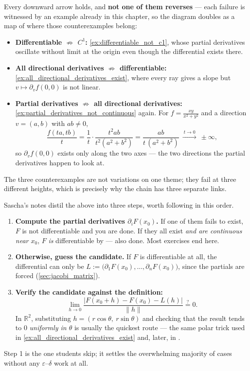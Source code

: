 Every downward arrow holds, and \textbf{not one of them reverses} --- each failure is witnessed
by an example already in this chapter, so the diagram doubles as a map of where those
counterexamples belong:
\begin{itemize}
  \item \textbf{Differentiable $\not\Rightarrow$ $C^1$:} \cref{ex:differentiable_not_c1}, whose
    partial derivatives oscillate without limit at the origin even though the differential
    exists there.
  \item \textbf{All directional derivatives $\not\Rightarrow$ differentiable:}
    \cref{ex:all_directional_derivatives_exist}, where every ray gives a slope but
    $v \mapsto \partial_vf(0,0)$ is not linear.
  \item \textbf{Partial derivatives $\not\Rightarrow$ all directional derivatives:}
    \cref{ex:partial_derivatives_not_continuous} again. For $f = \tfrac{xy}{x^2+y^2}$ and a
    direction $v = (a,b)$ with $ab \neq 0$,
    \[\frac{f(ta,tb)}{t} = \frac{1}{t}\cdot\frac{t^2ab}{t^2(a^2+b^2)}
      = \frac{ab}{t\,(a^2+b^2)} \ \xrightarrow{\ t \to 0\ }\ \pm\infty,\]
    so $\partial_vf(0,0)$ exists only along the two axes --- the two directions the partial
    derivatives happen to look at.
\end{itemize}
The three counterexamples are not variations on one theme; they fail at three different
heights, which is precisely why the chain has three separate links.

\begin{remark}
\label{rem:differentiability_recipe}
Sascha's notes distil the above into three steps, worth following in this order.
\begin{enumerate}[label=\textbf{\arabic*.}]
  \item \textbf{Compute the partial derivatives $\partial_iF(x_0)$.} If one of them fails to
    exist, $F$ is not differentiable and you are done. If they all exist \emph{and are
    continuous near $x_0$}, $F$ \emph{is} differentiable by
     --- also done. Most exercises end here.
  \item \textbf{Otherwise, guess the candidate.} If $F$ is differentiable at all, the differential
    can only be $L := \big(\partial_1F(x_0),\dots,\partial_nF(x_0)\big)$, since the partials are
    forced (\cref{sec:jacobi_matrix}).
  \item \textbf{Verify the candidate against the definition:}
    \[\lim_{h\to0}\frac{\big|F(x_0+h)-F(x_0)-L(h)\big|}{\lVert h\rVert} \overset{?}{=} 0.\]
    In $\mathbb{R}^2$, substituting $h = (r\cos\theta,\ r\sin\theta)$ and checking that the
    result tends to $0$ \emph{uniformly in $\theta$} is usually the quickest route --- the same
    polar trick used in \cref{ex:all_directional_derivatives_exist} and, later, in
    .
\end{enumerate}
Step 1 is the one students skip; it settles the overwhelming majority of cases without any
$\varepsilon$--$\delta$ work at all.
\end{remark}

